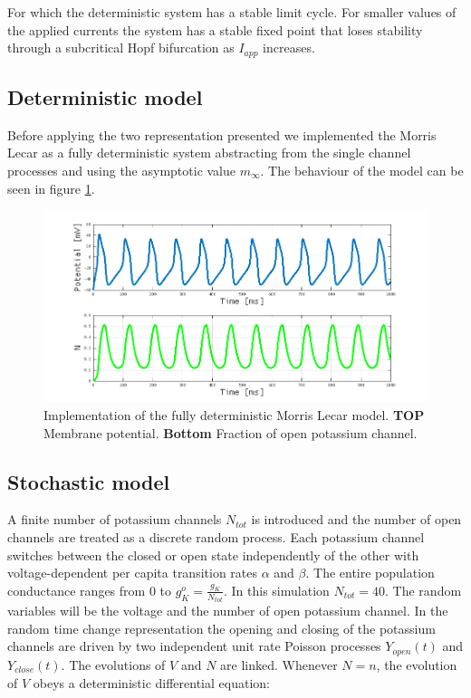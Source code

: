 For which the deterministic system has a stable limit cycle.
For smaller values of the applied currents the system has a stable fixed point that loses stability through a subcritical Hopf bifurcation as $I_{app}$ increases.

	\subsection{Deterministic model}
	Before applying the two representation presented we implemented the Morris Lecar as a fully deterministic system abstracting from the single channel processes and using the asymptotic value $m_\infty$.
	The behaviour of the model can be seen in figure \ref{fig:morris-lecar}.

	\begin{figure}
		\includegraphics[width=\textwidth]{Figures/morris-lecar}
		\caption{Implementation of the fully deterministic Morris Lecar model. \textbf{TOP} Membrane potential. \textbf{Bottom} Fraction of open potassium channel.}
		\label{fig:morris-lecar}
	\end{figure}

	\subsection{Stochastic model}
	A finite number of potassium channels $N_{tot}$ is introduced and the number of open channels are treated as a discrete random process.
	Each potassium channel switches between the closed or open state independently of the other with voltage-dependent per capita transition rates $\alpha$ and $\beta$.
	The entire population conductance ranges from $0$ to $g_K^o = \frac{g_K}{N_{tot}}$.
	In this simulation $N_{tot} = 40$.
	The random variables will be the voltage and the number of open potassium channel.
	In the random time change representation the opening and closing of the potassium channels are driven by two independent unit rate Poisson processes $Y_{open}(t)$ and $Y_{close}(t)$.
	The evolutions  of $V$ and $N$ are linked.
	Whenever $N=n$, the evolution of $V$ obeys a deterministic differential equation:

